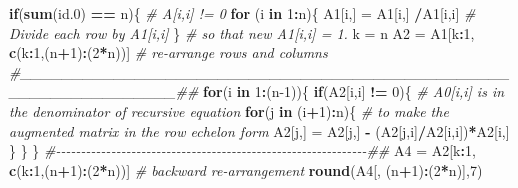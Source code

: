 \documentclass[
]{book}
\newenvironment{Shaded}{\begin{snugshade}}{\end{snugshade}}
\newcommand{\CommentTok}[1]{\textcolor[rgb]{0.56,0.35,0.01}{\textit{#1}}}
\newcommand{\ControlFlowTok}[1]{\textcolor[rgb]{0.13,0.29,0.53}{\textbf{#1}}}
\newcommand{\DecValTok}[1]{\textcolor[rgb]{0.00,0.00,0.81}{#1}}
\newcommand{\FloatTok}[1]{\textcolor[rgb]{0.00,0.00,0.81}{#1}}
\newcommand{\FunctionTok}[1]{\textcolor[rgb]{0.13,0.29,0.53}{\textbf{#1}}}
\newcommand{\NormalTok}[1]{#1}
\newcommand{\OtherTok}[1]{\textcolor[rgb]{0.56,0.35,0.01}{#1}}
\newcommand{\SpecialCharTok}[1]{\textcolor[rgb]{0.81,0.36,0.00}{\textbf{#1}}}
\begin{document}
\begin{Shaded}
\begin{Highlighting}[]
    \ControlFlowTok{if}\NormalTok{(}\FunctionTok{sum}\NormalTok{(id}\FloatTok{.0}\NormalTok{) }\SpecialCharTok{==}\NormalTok{ n)\{                        }\CommentTok{\# A[i,i] != 0}
             \ControlFlowTok{for}\NormalTok{ (i }\ControlFlowTok{in} \DecValTok{1}\SpecialCharTok{:}\NormalTok{n)\{}
\NormalTok{                    A1[i,] }\OtherTok{=}\NormalTok{ A1[i,] }\SpecialCharTok{/}\NormalTok{A1[i,i]   }\CommentTok{\# Divide each row by A1[i,i] }
\NormalTok{                   \}                           }\CommentTok{\# so that new A1[i,i] = 1.}
\NormalTok{             k }\OtherTok{=}\NormalTok{ n}
\NormalTok{            A2 }\OtherTok{=}\NormalTok{ A1[k}\SpecialCharTok{:}\DecValTok{1}\NormalTok{, }\FunctionTok{c}\NormalTok{(k}\SpecialCharTok{:}\DecValTok{1}\NormalTok{,(n}\SpecialCharTok{+}\DecValTok{1}\NormalTok{)}\SpecialCharTok{:}\NormalTok{(}\DecValTok{2}\SpecialCharTok{*}\NormalTok{n))]     }\CommentTok{\# re{-}arrange rows and columns}
           \CommentTok{\#\_\_\_\_\_\_\_\_\_\_\_\_\_\_\_\_\_\_\_\_\_\_\_\_\_\_\_\_\_\_\_\_\_\_\_\_\_\_\_\_\_\_\_\_\_\_\_\_\_\_\_\_\_\_\_\_\_\_\_\_\_\_\_\#\#}
             \ControlFlowTok{for}\NormalTok{(i }\ControlFlowTok{in} \DecValTok{1}\SpecialCharTok{:}\NormalTok{(n}\DecValTok{{-}1}\NormalTok{))\{}
                  \ControlFlowTok{if}\NormalTok{(A2[i,i] }\SpecialCharTok{!=} \DecValTok{0}\NormalTok{)\{    }\CommentTok{\# A0[i,i] is in the denominator of recursive equation}
                  \ControlFlowTok{for}\NormalTok{(j }\ControlFlowTok{in}\NormalTok{ (i}\SpecialCharTok{+}\DecValTok{1}\NormalTok{)}\SpecialCharTok{:}\NormalTok{n)\{  }\CommentTok{\# to make the augmented matrix in the row echelon form}
\NormalTok{                       A2[j,] }\OtherTok{=}\NormalTok{ A2[j,] }\SpecialCharTok{{-}}\NormalTok{ (A2[j,i]}\SpecialCharTok{/}\NormalTok{A2[i,i])}\SpecialCharTok{*}\NormalTok{A2[i,]}
\NormalTok{                       \}}
\NormalTok{                  \}}
\NormalTok{               \}}
           \CommentTok{\#{-}{-}{-}{-}{-}{-}{-}{-}{-}{-}{-}{-}{-}{-}{-}{-}{-}{-}{-}{-}{-}{-}{-}{-}{-}{-}{-}{-}{-}{-}{-}{-}{-}{-}{-}{-}{-}{-}{-}{-}{-}{-}{-}{-}{-}{-}{-}{-}{-}{-}{-}{-}{-}{-}{-}{-}{-}{-}{-}{-}{-}{-}\#\#}
\NormalTok{             A4 }\OtherTok{=}\NormalTok{ A2[k}\SpecialCharTok{:}\DecValTok{1}\NormalTok{, }\FunctionTok{c}\NormalTok{(k}\SpecialCharTok{:}\DecValTok{1}\NormalTok{,(n}\SpecialCharTok{+}\DecValTok{1}\NormalTok{)}\SpecialCharTok{:}\NormalTok{(}\DecValTok{2}\SpecialCharTok{*}\NormalTok{n))]     }\CommentTok{\# backward re{-}arrangement}
             \FunctionTok{round}\NormalTok{(A4[, (n}\SpecialCharTok{+}\DecValTok{1}\NormalTok{)}\SpecialCharTok{:}\NormalTok{(}\DecValTok{2}\SpecialCharTok{*}\NormalTok{n)],}\DecValTok{7}\NormalTok{)}

\end{Highlighting}
\end{Shaded}
\end{document}
